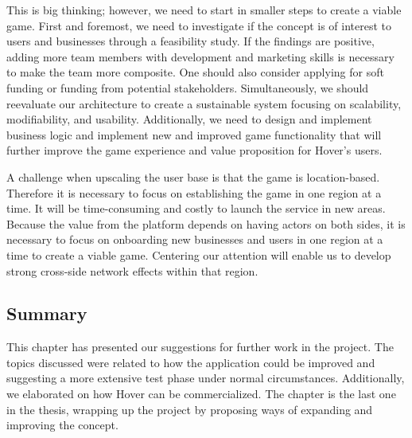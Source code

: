 This is big thinking; however, we need to start in smaller steps to create a viable game. First and foremost, we need to investigate if the concept is of interest to users and businesses through a feasibility study. If the findings are positive, adding more team members with development and marketing skills is necessary to make the team more composite. One should also consider applying for soft funding or funding from potential stakeholders. Simultaneously, we should reevaluate our architecture to create a sustainable system focusing on scalability, modifiability, and usability. Additionally, we need to design and implement business logic and implement new and improved game functionality that will further improve the game experience and value proposition for Hover’s users.

A challenge when upscaling the user base is that the game is location-based. Therefore it is necessary to focus on establishing the game in one region at a time. It will be time-consuming and costly to launch the service in new areas. Because the value from the platform depends on having actors on both sides, it is necessary to focus on onboarding new businesses and users in one region at a time to create a viable game. Centering our attention will enable us to develop strong cross-side network effects within that region.

\subsection{Summary}
This chapter has presented our suggestions for further work in the project. The topics discussed were related to how the application could be improved and suggesting a more extensive test phase under normal circumstances. Additionally, we elaborated on how Hover can be commercialized. The chapter is the last one in the thesis, wrapping up the project by proposing ways of expanding and improving the concept.

